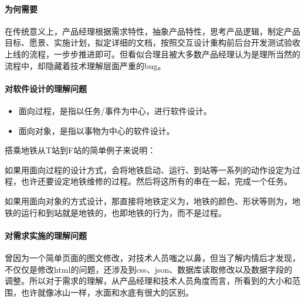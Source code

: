 \documentclass[letterpaper,11pt,english]{sphinxmanual}
\begin{document}
\paragraph{为何需要}
\label{\detokenize{chapter_idea/understand_tech:id2}}
在传统意义上，产品经理根据需求特性，抽象产品特性，思考产品逻辑，制定产品目标、愿景、实施计划，拟定详细的文档，按照交互\sphinxhyphen{}设计\sphinxhyphen{}重构\sphinxhyphen{}前后台开发\sphinxhyphen{}测试验收上线的流程，一步步推进即可。但看似合理且被大多数产品经理认为是理所当然的流程中，却隐藏着技术理解层面严重的bug。


\paragraph{对软件设计的理解问题}
\label{\detokenize{chapter_idea/understand_tech:id3}}\begin{itemize}
\item {} 
面向过程，是指以任务/事件为中心，进行软件设计。

\item {} 
面向对象，是指以事物为中心的软件设计。

\end{itemize}

搭乘地铁从T站到F站的简单例子来说明：

如果用面向过程的设计方式，会将地铁启动、运行、到站等一系列的动作设定为过程，也许还要设定地铁维修的过程。然后将这所有的串在一起，完成一个任务。

如果用面向对象的方式设计，那直接将地铁定义为，地铁的颜色、形状等则为，地铁的运行和到站就是地铁的，也即地铁的行为，而不是过程。


\paragraph{对需求实施的理解问题}
\label{\detokenize{chapter_idea/understand_tech:id4}}
曾因为一个简单页面的图文修改，对技术人员嗤之以鼻，但当了解内情后才发现，不仅仅是修改html的问题，还涉及到css、json、数据库读取修改以及数据字段的调整。所以对于需求的理解，从产品经理和技术人员角度而言，所看到的大小和范围，也许就像冰山一样，水面和水底有很大的区别。
\end{document}
